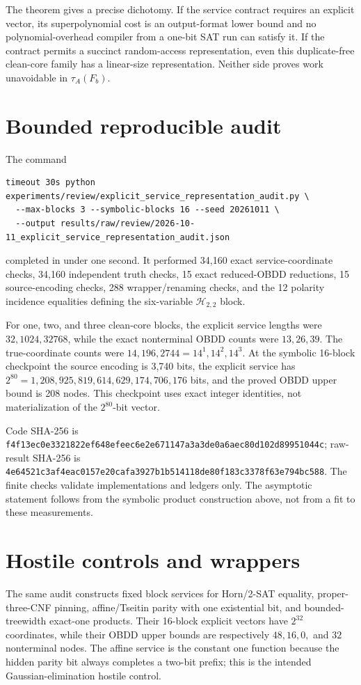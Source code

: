 \documentclass[11pt]{article}
\begin{document}
The theorem gives a precise dichotomy.  If the service contract requires an
explicit vector, its superpolynomial cost is an output-format lower bound and
no polynomial-overhead compiler from a one-bit SAT run can satisfy it.  If
the contract permits a succinct random-access representation, even this
duplicate-free clean-core family has a linear-size representation.  Neither
side proves work unavoidable in $\tau_A(F_b)$.

\section{Bounded reproducible audit}
The command
\begin{verbatim}
timeout 30s python experiments/review/explicit_service_representation_audit.py \
  --max-blocks 3 --symbolic-blocks 16 --seed 20261011 \
  --output results/raw/review/2026-10-11_explicit_service_representation_audit.json
\end{verbatim}
completed in under one second.  It performed 34,160 exact service-coordinate
checks, 34,160 independent truth checks, 15 exact reduced-OBDD reductions,
15 source-encoding checks, 288 wrapper/renaming checks, and the 12 polarity
incidence equalities defining the six-variable $\mathcal H_{2,2}$ block.

For one, two, and three clean-core blocks, the explicit service lengths were
$32,1024,32768$, while the exact nonterminal OBDD counts were $13,26,39$.
The true-coordinate counts were $14,196,2744=14^1,14^2,14^3$.  At the
symbolic 16-block checkpoint the source encoding is 3,740 bits, the explicit
service has $2^{80}=1{,}208{,}925{,}819{,}614{,}629{,}174{,}706{,}176$
bits, and the proved OBDD upper bound is 208 nodes.  This checkpoint uses
exact integer identities, not materialization of the $2^{80}$-bit vector.

Code SHA-256 is
\nolinkurl{f4f13ec0e3321822ef648efeec6e2e671147a3a3de0a6aec80d102d89951044c};
raw-result SHA-256 is
\nolinkurl{4e64521c3af4eac0157e20cafa3927b1b514118de80f183c3378f63e794bc588}.
The finite checks validate implementations and ledgers only.  The asymptotic
statement follows from the symbolic product construction above, not from a
fit to these measurements.

\section{Hostile controls and wrappers}
The same audit constructs fixed block services for Horn/2-SAT equality,
proper-three-CNF pinning, affine/Tseitin parity with one existential bit, and
bounded-treewidth exact-one products.  Their 16-block explicit vectors have
$2^{32}$ coordinates, while their OBDD upper bounds are respectively
$48,16,0,$ and $32$ nonterminal nodes.  The affine service is the constant
one function because the hidden parity bit always completes a two-bit
prefix; this is the intended Gaussian-elimination hostile control.
\end{document}

